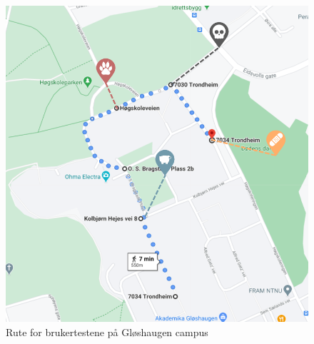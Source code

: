 \begin{figure}[H]
\centering
\captionsetup{width=.8\linewidth}
\includegraphics[scale=0.5]{Figurer/Bilder/brukertest_rute_med_pins.png}
\caption{Rute for brukertestene på Gløshaugen campus}
\label{fig:brukertest_rute}
\end{figure}
 
